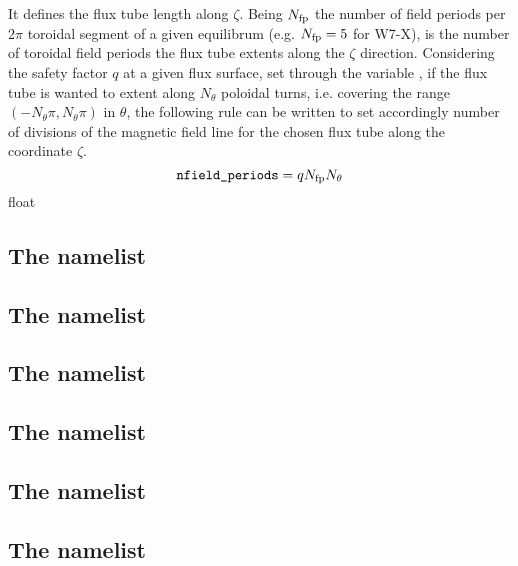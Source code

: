 {It defines the flux tube length along $\zeta$. 
  Being $N_{\text{fp}}$ the number of field periods per $2\pi$ toroidal 
  segment of a given equilibrum (e.g. $N_{\text{fp}}=5$ for W7-X), 
   is the 
  number of toroidal field periods the flux tube extents along 
  the $\zeta$ direction. Considering the safety factor $q$ at 
  a given flux surface, set through the variable , 
  if the flux tube is wanted to extent along $N_{\theta}$ poloidal 
  turns, i.e. covering the range $\left(-N_{\theta}\pi, N_{\theta}\pi\right)$ 
  in $\theta$, the following rule can be written to set accordingly 
  number of divisions of the magnetic field line 
  for the chosen flux tube along the coordinate $\zeta$.
  \begin{equation}
    \texttt{nfield\_periods}=qN_{\text{fp}} N_{\theta}
  \end{equation}}
{float}{}

\subsection{The  namelist}\label{sec:NL_ZGRID}
\subsection{The  namelist}
\subsection{The  namelist}
\subsection{The  namelist}
\subsection{The  namelist}
\subsection{The  namelist}

